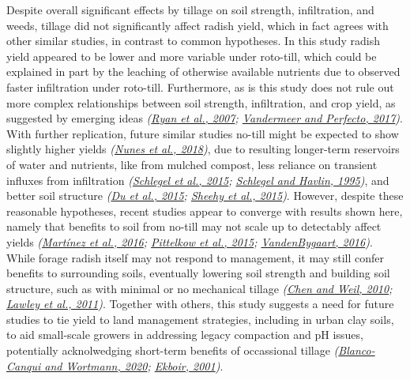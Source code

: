 \documentclass[
  12pt,
]{article}
\begin{document}
Despite overall significant effects by tillage on soil strength, infiltration, and weeds, tillage did not significantly affect radish yield, which in fact agrees with other similar studies, in contrast to common hypotheses.
In this study radish yield appeared to be lower and more variable under roto-till, which could be explained in part by the leaching of otherwise available nutrients due to observed faster infiltration under roto-till.
Furthermore, as is this study does not rule out more complex relationships between soil strength, infiltration, and crop yield, as suggested by emerging ideas \emph{(\protect\hyperlink{ref-ryan07}{Ryan et al., 2007}; \protect\hyperlink{ref-vandermeer17}{Vandermeer and Perfecto, 2017})}.
With further replication, future similar studies no-till might be expected to show slightly higher yields \emph{(\protect\hyperlink{ref-nunes18}{Nunes et al., 2018})}, due to resulting longer-term reservoirs of water and nutrients, like from mulched compost, less reliance on transient influxes from infiltration \emph{(\protect\hyperlink{ref-schlegel15}{Schlegel et al., 2015}; \protect\hyperlink{ref-schlegel95}{Schlegel and Havlin, 1995})}, and better soil structure \emph{(\protect\hyperlink{ref-du15}{Du et al., 2015}; \protect\hyperlink{ref-sheehy15}{Sheehy et al., 2015})}.
However, despite these reasonable hypotheses, recent studies appear to converge with results shown here, namely that benefits to soil from no-till may not scale up to detectably affect yields \emph{(\protect\hyperlink{ref-martinez16}{Martínez et al., 2016}; \protect\hyperlink{ref-pittelkow15}{Pittelkow et al., 2015}; \protect\hyperlink{ref-vandenbygaart16}{VandenBygaart, 2016})}.
While forage radish itself may not respond to management, it may still confer benefits to surrounding soils, eventually lowering soil strength and building soil structure, such as with minimal or no mechanical tillage \emph{(\protect\hyperlink{ref-chen10b}{Chen and Weil, 2010}; \protect\hyperlink{ref-lawley11}{Lawley et al., 2011})}.
Together with others, this study suggests a need for future studies to tie yield to land management strategies, including in urban clay soils, to aid small-scale growers in addressing legacy compaction and pH issues, potentially acknolwedging short-term benefits of occassional tillage \emph{(\protect\hyperlink{ref-blanco-canqui20}{Blanco-Canqui and Wortmann, 2020}; \protect\hyperlink{ref-ekboir01}{Ekboir, 2001})}.
\end{document}
